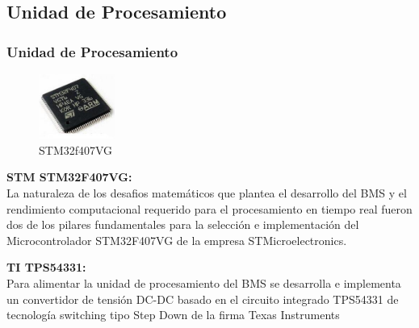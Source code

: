 \documentclass[10pt]{beamer}
\theoremstyle{remark}
\theoremstyle{definition}
\begin{document}
\subsection{Unidad de Procesamiento}
\begin{frame}
    \frametitle{Unidad de Procesamiento}

    \begin{figure}
        \includegraphics[width=2.5cm]{images/STM32F407VG.png}
        \caption{STM32f407VG}
        \label{fig:stm32f407vg}                                                            
    \end{figure}                                                                 

    \textbf{STM STM32F407VG:}\\
    La naturaleza de los desafios matemáticos que plantea el desarrollo del BMS y el
    rendimiento computacional requerido para el procesamiento en tiempo real fueron
    dos de los pilares fundamentales para la selección e implementación del
    Microcontrolador STM32F407VG de la empresa STMicroelectronics.

    \textbf{TI TPS54331:}\\
    Para alimentar la unidad de procesamiento del BMS se desarrolla e implementa
    un convertidor de tensión DC-DC basado en el circuito integrado TPS54331 de
    tecnolog\'ia switching tipo Step Down de la firma Texas Instruments

\end{frame}
\end{document}
